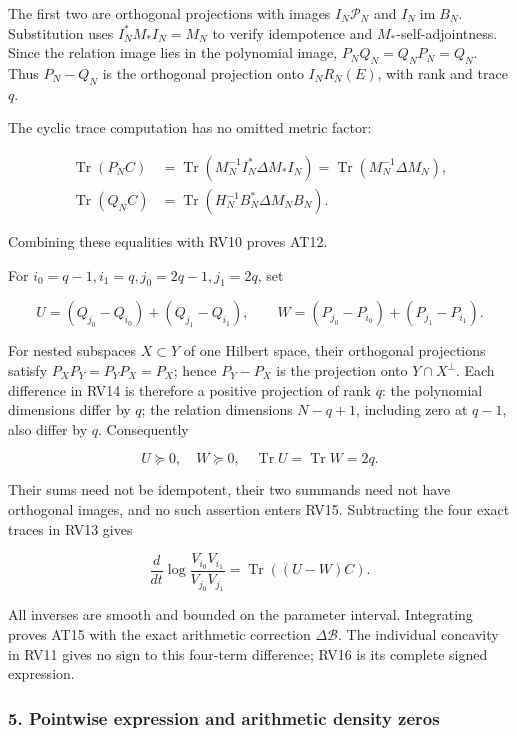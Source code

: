 \documentclass{article}
\begin{document}
The first two are orthogonal projections with images \(I_N\mathcal P_N\) and \(I_N\operatorname{im}B_N\). Substitution uses \(I_N^*M_*I_N=M_N\) to verify idempotence and \(M_*\)-self-adjointness. Since the relation image lies in the polynomial image, \(P_NQ_N=Q_NP_N=Q_N\). Thus \(P_N-Q_N\) is the orthogonal projection onto \(I_NR_N(E)\), with rank and trace \(q\).

The cyclic trace computation has no omitted metric factor:

\[
\begin{aligned}
\operatorname{Tr}(P_NC)
&=\operatorname{Tr}(M_N^{-1}I_N^*\Delta M_*I_N)
=\operatorname{Tr}(M_N^{-1}\Delta M_N),\\
\operatorname{Tr}(Q_NC)
&=\operatorname{Tr}(H_N^{-1}B_N^*\Delta M_NB_N).
\end{aligned}
\tag{RV13}
\]

Combining these equalities with RV10 proves AT12.

For \(i_0=q-1,i_1=q,j_0=2q-1,j_1=2q\), set

\[
U=(Q_{j_0}-Q_{i_0})+(Q_{j_1}-Q_{i_1}),\qquad
W=(P_{j_0}-P_{i_0})+(P_{j_1}-P_{i_1}).
\tag{RV14}
\]

For nested subspaces \(X\subset Y\) of one Hilbert space, their orthogonal projections satisfy \(P_XP_Y=P_YP_X=P_X\); hence \(P_Y-P_X\) is the projection onto \(Y\cap X^\perp\). Each difference in RV14 is therefore a positive projection of rank \(q\): the polynomial dimensions differ by \(q\); the relation dimensions \(N-q+1\), including zero at \(q-1\), also differ by \(q\). Consequently

\[
U\succeq0,\quad W\succeq0,\quad
\operatorname{Tr}U=\operatorname{Tr}W=2q.
\tag{RV15}
\]

Their sums need not be idempotent, their two summands need not have orthogonal images, and no such assertion enters RV15. Subtracting the four exact traces in RV13 gives

\[
\frac d{dt}\log\frac{V_{i_0}V_{i_1}}{V_{j_0}V_{j_1}}
=\operatorname{Tr}((U-W)C).
\tag{RV16}
\]

All inverses are smooth and bounded on the parameter interval. Integrating proves AT15 with the exact arithmetic correction \(\Delta\mathcal B\). The individual concavity in RV11 gives no sign to this four-term difference; RV16 is its complete signed expression.

\subsubsection{5. Pointwise expression and arithmetic density zeros}\label{endpoint-determinant_review--pointwise-expression-and-arithmetic-density-zeros}
\end{document}
